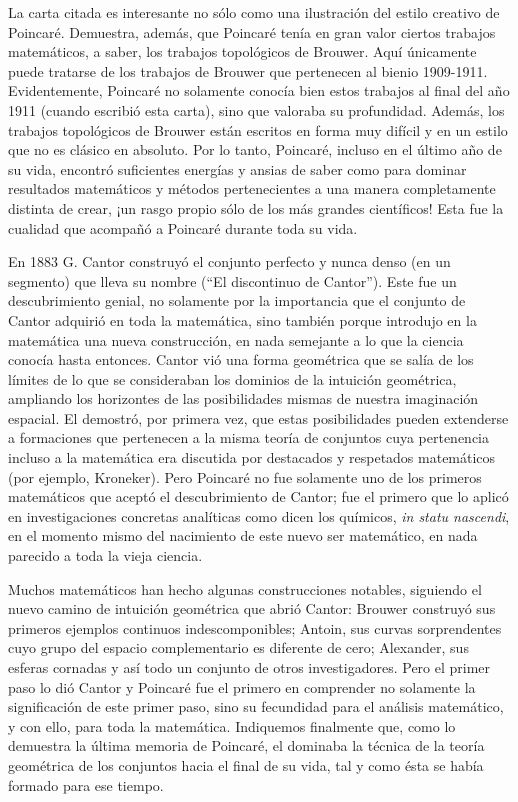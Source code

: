 \documentclass[a4paper, 12pt]{article}
\begin{document}
La carta citada es interesante no sólo como una ilustración del estilo creativo de Poincaré. Demuestra, además, que Poincaré tenía en gran valor ciertos trabajos matemáticos, a saber, los trabajos topológicos de Brouwer. Aquí únicamente puede tratarse de los trabajos de Brouwer que pertenecen al bienio 1909-1911. Evidentemente, Poincaré no solamente conocía bien estos trabajos al final del año 1911 (cuando escribió esta carta), sino que valoraba su profundidad. Además, los trabajos topológicos de Brouwer están escritos en forma muy difícil y en un estilo que no es clásico en  absoluto. Por lo tanto, Poincaré, incluso en el último año de su vida, encontró suficientes energías y ansias de saber como para dominar resultados matemáticos y métodos pertenecientes a una manera completamente distinta de crear, ¡un rasgo propio sólo de los más grandes científicos! Esta fue la cualidad que acompañó a Poincaré durante toda su vida. 

En 1883 G. Cantor construyó el conjunto perfecto y nunca denso (en un segmento) que lleva su nombre (``El discontinuo de Cantor''). Este fue un descubrimiento genial,
no solamente por la importancia que el conjunto de Cantor adquirió en toda la matemática, sino también porque introdujo en la matemática una nueva construcción, en nada semejante a lo que la ciencia conocía hasta entonces. Cantor vió una forma geométrica que se salía
de los límites de lo que se consideraban los dominios de la intuición geométrica, ampliando los horizontes de las posibilidades mismas de nuestra imaginación espacial. El demostró, por primera vez, que estas posibilidades pueden extenderse a formaciones que pertenecen a la misma teoría de conjuntos cuya pertenencia incluso a la matemática era discutida por destacados y respetados matemáticos (por ejemplo, Kroneker). Pero Poincaré no fue solamente uno de los primeros matemáticos que aceptó el descubrimiento de Cantor; fue el primero que lo aplicó en investigaciones concretas analíticas como dicen los químicos, {\it in statu nascendi}, en el momento mismo del nacimiento de este nuevo ser matemático, en nada parecido a toda la vieja ciencia.

Muchos matemáticos han hecho algunas construcciones notables, siguiendo el nuevo camino de intuición geométrica que abrió Cantor: Brouwer construyó sus primeros ejemplos continuos indescomponibles; Antoin, sus curvas sorprendentes cuyo grupo del espacio complementario es diferente de cero; Alexander, sus esferas cornadas y así todo un conjunto de otros investigadores. Pero el primer paso lo dió Cantor y Poincaré fue el primero en comprender no solamente la significación de este primer paso, sino su fecundidad para el análisis matemático, y con ello, para toda la matemática. Indiquemos finalmente que, como lo demuestra la última memoria de Poincaré, el dominaba la técnica de la teoría geométrica de los conjuntos hacia el final de su vida, tal y como ésta se había formado para
ese tiempo.
\end{document}
